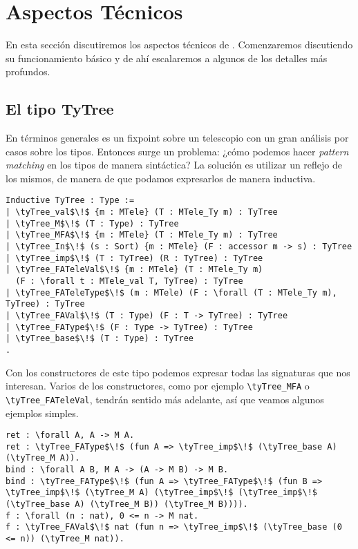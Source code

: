 \chapter{Aspectos Técnicos}\label{ch:technical}

En esta sección discutiremos los aspectos técnicos de \lift.
Comenzaremos discutiendo su funcionamiento básico y de ahí escalaremos a algunos de los detalles más profundos. 

\section{El tipo TyTree}

En términos generales \lift es un fixpoint sobre un telescopio con un gran análisis por casos sobre los tipos.
Entonces surge un problema: ¿cómo podemos hacer \textit{pattern matching} en los tipos de manera sintáctica?
La solución es utilizar un reflejo de los mismos, de manera de que podamos expresarlos de manera inductiva.

\begin{lstlisting}[float=h,frame=tb,caption={El tipo inductivo \lstinline{TyTree}},label=lst:tytree]
Inductive TyTree : Type :=
| \tyTree_val$\!$ {m : MTele} (T : MTele_Ty m) : TyTree
| \tyTree_M$\!$ (T : Type) : TyTree
| \tyTree_MFA$\!$ {m : MTele} (T : MTele_Ty m) : TyTree
| \tyTree_In$\!$ (s : Sort) {m : MTele} (F : accessor m -> s) : TyTree
| \tyTree_imp$\!$ (T : TyTree) (R : TyTree) : TyTree
| \tyTree_FATeleVal$\!$ {m : MTele} (T : MTele_Ty m)
  (F : \forall t : MTele_val T, TyTree) : TyTree
| \tyTree_FATeleType$\!$ (m : MTele) (F : \forall (T : MTele_Ty m), TyTree) : TyTree
| \tyTree_FAVal$\!$ (T : Type) (F : T -> TyTree) : TyTree
| \tyTree_FAType$\!$ (F : Type -> TyTree) : TyTree
| \tyTree_base$\!$ (T : Type) : TyTree
.
\end{lstlisting}

Con los constructores de este tipo podemos expresar todas las signaturas que nos interesan. Varios de los constructores, como por ejemplo \lstinline{\tyTree_MFA} o \lstinline{\tyTree_FATeleVal}, tendrán sentido más adelante, así que veamos algunos ejemplos simples.

\begin{lstlisting}[frame=tb,caption={Ejemplos de \lstinline{TyTree}},label=lst:exmp_tytree]
ret : \forall A, A -> M A.
ret : \tyTree_FAType$\!$ (fun A => \tyTree_imp$\!$ (\tyTree_base A) (\tyTree_M A)).
bind : \forall A B, M A -> (A -> M B) -> M B.
bind : \tyTree_FAType$\!$ (fun A => \tyTree_FAType$\!$ (fun B => \tyTree_imp$\!$ (\tyTree_M A) (\tyTree_imp$\!$ (\tyTree_imp$\!$ (\tyTree_base A) (\tyTree_M B)) (\tyTree_M B)))).
f : \forall (n : nat), 0 <= n -> M nat.
f : \tyTree_FAVal$\!$ nat (fun n => \tyTree_imp$\!$ (\tyTree_base (0 <= n)) (\tyTree_M nat)).
\end{lstlisting}

